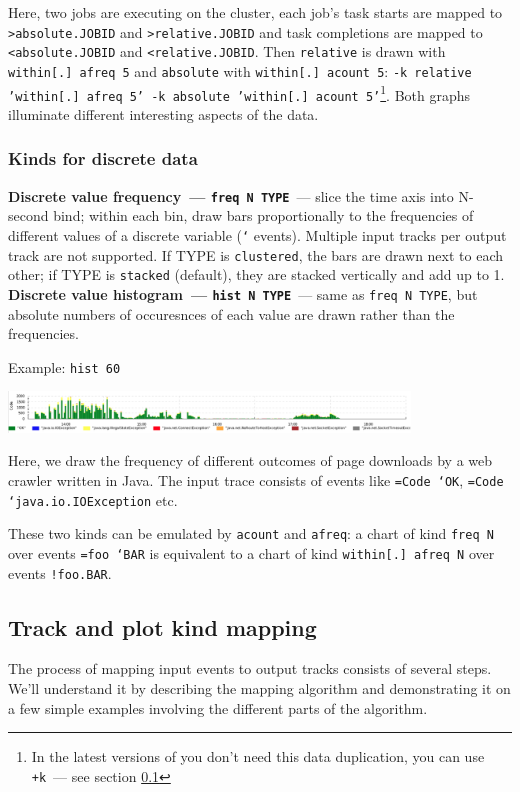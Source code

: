 \documentclass{article}
\begin{document}
Here, two jobs are executing on the cluster, each job's task starts are mapped to \texttt{>absolute.JOBID} and \texttt{>relative.JOBID} and task completions are mapped to \texttt{<absolute.JOBID} and \texttt{<relative.JOBID}. Then \texttt{relative} is drawn with \texttt{within[.] afreq 5} and \texttt{absolute} with \texttt{within[.] acount 5}: \texttt{-k relative 'within[.] afreq 5' -k absolute 'within[.] acount 5'}\footnote{In the latest versions of \timeplot{} you don't need this data duplication, you can use \texttt{+k}~--- see section \ref{sec:tplot-track-mapping}}. Both graphs illuminate different interesting aspects of the data.

\pagebreak
\subsubsection{Kinds for discrete data}
\noindent
\textbf{Discrete value frequency~--- \texttt{freq N TYPE}}~--- slice the time axis into N-second bind; within each bin, draw bars proportionally to the frequencies of different values of a discrete variable (\texttt{`} events). Multiple input tracks per output track are not supported. If TYPE is \texttt{clustered}, the bars are drawn next to each other; if TYPE is \texttt{stacked} (default), they are stacked vertically and add up to 1.
\noindent
\textbf{Discrete value histogram~--- \texttt{hist N TYPE}}~--- same as \texttt{freq N TYPE}, but absolute numbers of occuresnces of each value are drawn rather than the frequencies.

Example: \texttt{hist 60}

{\centering \includegraphics[width=0.8\textwidth]{pics/tplot/hist.png}}

Here, we draw the frequency of different outcomes of page downloads by a web crawler written in Java. The input trace consists of events like \texttt{=Code `OK}, \texttt{=Code `java.io.IOException} etc.

These two kinds can be emulated by \texttt{acount} and \texttt{afreq}: a chart of kind \texttt{freq N} over events \texttt{=foo `BAR} is equivalent to a chart of kind \texttt{within[.] afreq N} over events \texttt{!foo.BAR}.

\pagebreak
\subsection{Track and plot kind mapping}
\label{sec:tplot-track-mapping}
The process of mapping input events to output tracks consists of several steps. We'll understand it by describing the mapping algorithm and demonstrating it on a few simple examples involving the different parts of the algorithm.
\end{document}

